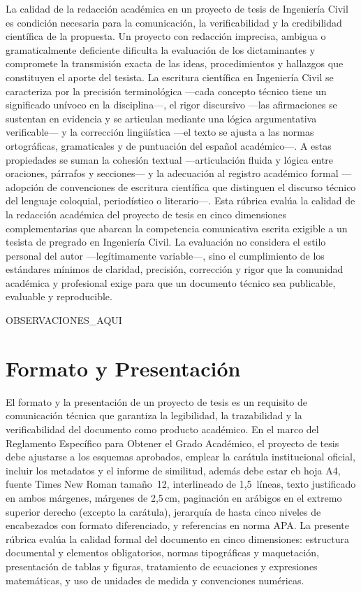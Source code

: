 \documentclass[12pt,a4paper]{report}
\begin{document}
La calidad de la redacción académica en un proyecto de tesis de Ingeniería Civil es condición necesaria para la comunicación, la verificabilidad y la credibilidad científica de la propuesta. Un proyecto con redacción imprecisa, ambigua o gramaticalmente deficiente dificulta la evaluación de los dictaminantes y compromete la transmisión exacta de las ideas, procedimientos y hallazgos que constituyen el aporte del tesista. La escritura científica en Ingeniería Civil se caracteriza por la precisión terminológica —cada concepto técnico tiene un significado unívoco en la disciplina—, el rigor discursivo —las afirmaciones se sustentan en evidencia y se articulan mediante una lógica argumentativa verificable— y la corrección lingüística —el texto se ajusta a las normas ortográficas, gramaticales y de puntuación del español académico—. A estas propiedades se suman la cohesión textual —articulación fluida y lógica entre oraciones, párrafos y secciones— y la adecuación al registro académico formal —adopción de convenciones de escritura científica que distinguen el discurso técnico del lenguaje coloquial, periodístico o literario—. Esta rúbrica evalúa la calidad de la redacción académica del proyecto de tesis en cinco dimensiones complementarias que abarcan la competencia comunicativa escrita exigible a un tesista de pregrado en Ingeniería Civil. La evaluación no considera el estilo personal del autor —legítimamente variable—, sino el cumplimiento de los estándares mínimos de claridad, precisión, corrección y rigor que la comunidad académica y profesional exige para que un documento técnico sea publicable, evaluable y reproducible.


{{OBSERVACIONES_AQUI}}


\section{Formato y Presentación}

El formato y la presentación de un proyecto de tesis es un requisito de comunicación técnica que garantiza la legibilidad, la trazabilidad y la verificabilidad del documento como producto académico. En el marco del Reglamento Específico para Obtener el Grado Académico, el proyecto de tesis debe ajustarse a los esquemas aprobados, emplear la carátula institucional oficial, incluir los metadatos y el informe de similitud, además debe estar eb hoja A4, fuente Times New Roman tamaño~12, interlineado de 1,5~líneas, texto justificado en ambos márgenes, márgenes de 2,5\,cm, paginación en arábigos en el extremo superior derecho (excepto la carátula), jerarquía de hasta cinco niveles de encabezados con formato diferenciado, y referencias en norma APA. La presente rúbrica evalúa la calidad formal del documento en cinco dimensiones: estructura documental y elementos obligatorios, normas tipográficas y maquetación, presentación de tablas y figuras, tratamiento de ecuaciones y expresiones matemáticas, y uso de unidades de medida y convenciones numéricas.
\end{document}
